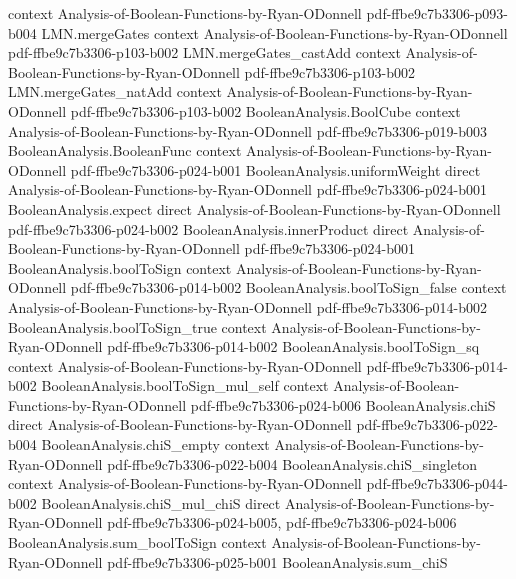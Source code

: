 \begin{lemma}
  {context}
  {Analysis-of-Boolean-Functions-by-Ryan-ODonnell}
  {pdf-ffbe9c7b3306-p093-b004}
\proofstep
  {LMN.mergeGates}
  {context}
  {Analysis-of-Boolean-Functions-by-Ryan-ODonnell}
  {pdf-ffbe9c7b3306-p103-b002}
\proofstep
  {LMN.mergeGates_castAdd}
  {context}
  {Analysis-of-Boolean-Functions-by-Ryan-ODonnell}
  {pdf-ffbe9c7b3306-p103-b002}
\proofstep
  {LMN.mergeGates_natAdd}
  {context}
  {Analysis-of-Boolean-Functions-by-Ryan-ODonnell}
  {pdf-ffbe9c7b3306-p103-b002}
\proofstep
  {BooleanAnalysis.BoolCube}
  {context}
  {Analysis-of-Boolean-Functions-by-Ryan-ODonnell}
  {pdf-ffbe9c7b3306-p019-b003}
\proofstep
  {BooleanAnalysis.BooleanFunc}
  {context}
  {Analysis-of-Boolean-Functions-by-Ryan-ODonnell}
  {pdf-ffbe9c7b3306-p024-b001}
\proofstep
  {BooleanAnalysis.uniformWeight}
  {direct}
  {Analysis-of-Boolean-Functions-by-Ryan-ODonnell}
  {pdf-ffbe9c7b3306-p024-b001}
\proofstep
  {BooleanAnalysis.expect}
  {direct}
  {Analysis-of-Boolean-Functions-by-Ryan-ODonnell}
  {pdf-ffbe9c7b3306-p024-b002}
\proofstep
  {BooleanAnalysis.innerProduct}
  {direct}
  {Analysis-of-Boolean-Functions-by-Ryan-ODonnell}
  {pdf-ffbe9c7b3306-p024-b001}
\proofstep
  {BooleanAnalysis.boolToSign}
  {context}
  {Analysis-of-Boolean-Functions-by-Ryan-ODonnell}
  {pdf-ffbe9c7b3306-p014-b002}
\proofstep
  {BooleanAnalysis.boolToSign_false}
  {context}
  {Analysis-of-Boolean-Functions-by-Ryan-ODonnell}
  {pdf-ffbe9c7b3306-p014-b002}
\proofstep
  {BooleanAnalysis.boolToSign_true}
  {context}
  {Analysis-of-Boolean-Functions-by-Ryan-ODonnell}
  {pdf-ffbe9c7b3306-p014-b002}
\proofstep
  {BooleanAnalysis.boolToSign_sq}
  {context}
  {Analysis-of-Boolean-Functions-by-Ryan-ODonnell}
  {pdf-ffbe9c7b3306-p014-b002}
\proofstep
  {BooleanAnalysis.boolToSign_mul_self}
  {context}
  {Analysis-of-Boolean-Functions-by-Ryan-ODonnell}
  {pdf-ffbe9c7b3306-p024-b006}
\proofstep
  {BooleanAnalysis.chiS}
  {direct}
  {Analysis-of-Boolean-Functions-by-Ryan-ODonnell}
  {pdf-ffbe9c7b3306-p022-b004}
\proofstep
  {BooleanAnalysis.chiS_empty}
  {context}
  {Analysis-of-Boolean-Functions-by-Ryan-ODonnell}
  {pdf-ffbe9c7b3306-p022-b004}
\proofstep
  {BooleanAnalysis.chiS_singleton}
  {context}
  {Analysis-of-Boolean-Functions-by-Ryan-ODonnell}
  {pdf-ffbe9c7b3306-p044-b002}
\proofstep
  {BooleanAnalysis.chiS_mul_chiS}
  {direct}
  {Analysis-of-Boolean-Functions-by-Ryan-ODonnell}
  {pdf-ffbe9c7b3306-p024-b005,
    pdf-ffbe9c7b3306-p024-b006}
\proofstep
  {BooleanAnalysis.sum_boolToSign}
  {context}
  {Analysis-of-Boolean-Functions-by-Ryan-ODonnell}
  {pdf-ffbe9c7b3306-p025-b001}
\proofstep
  {BooleanAnalysis.sum_chiS}

\end{lemma}
